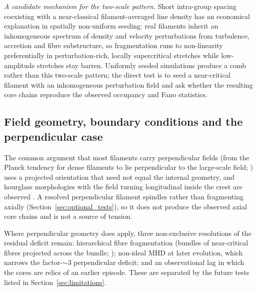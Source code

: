 \documentclass[usenatbib,twoside,twocolumn]{mnras}
\begin{document}
\smallskip\noindent\emph{A candidate mechanism for the two-scale pattern.} Short intra-group spacing coexisting with a near-classical filament-averaged line density has an economical explanation in spatially non-uniform seeding: real filaments inherit an inhomogeneous spectrum of density and velocity perturbations from turbulence, accretion and fibre substructure, so fragmentation runs to non-linearity preferentially in perturbation-rich, locally supercritical stretches while low-amplitude stretches stay barren. Uniformly seeded simulations produce a comb rather than this two-scale pattern; the direct test is to seed a near-critical filament with an inhomogeneous perturbation field and ask whether the resulting core chains reproduce the observed occupancy and Fano statistics.

\subsection{Field geometry, boundary conditions and the perpendicular case}
\label{sec:why_mhd_fails}

The common argument that most filaments carry perpendicular fields (from the Planck tendency for dense filaments to lie perpendicular to the large-scale field; \citealt{Planck2016}) uses a projected orientation that need not equal the internal geometry, and hourglass morphologies with the field turning longitudinal inside the crest are observed \citep{Jadhav2026}. A resolved perpendicular filament spindles rather than fragmenting axially (Section~\ref{sec:optional_tests}), so it does not produce the observed axial core chains and is not a source of tension.

Where perpendicular geometry does apply, three non-exclusive resolutions of the residual deficit remain: hierarchical fibre fragmentation (bundles of near-critical fibres projected across the bundle; \citealt{Hacar2013,Hacar2018,Yang2024}); non-ideal MHD at later evolution, which narrows the factor-$\sim3$ perpendicular deficit; and an observational lag in which the cores are relics of an earlier episode. These are separated by the future tests listed in Section~\ref{sec:limitations}.
\end{document}
